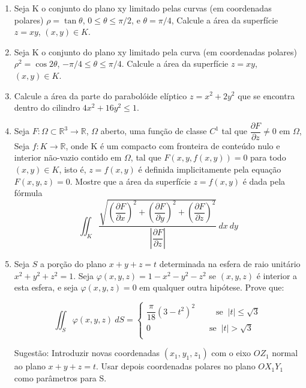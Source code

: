 \documentclass[11pt,a4paper]{article}
\begin{document}
\begin{enumerate}
\item Seja K o conjunto do plano xy limitado pelas curvas (em coordenadas polares) $\rho = \tan \theta$, $0 \leq \theta \leq \pi/2$, e $\theta = \pi/4$, Calcule a área da superfície $z = xy$, $(x,y) \in K$.

\item Seja K o conjunto do plano xy limitado pela curva (em coordenadas polares) $\rho^2 = \cos 2 \theta$, $-\pi/4 \leq \theta \leq \pi/4$. Calcule a área da superfície $z = xy$, $(x,y) \in K$.

\item Calcule a área da parte do parabolóide elíptico $z = x^2 + 2y^2$ que se encontra dentro do cilindro $4x^2 + 16y^2 \leq 1$.

\item Seja $F:\Omega \subset \mathbb{R}^3 \to \mathbb{R}$, $\Omega$  aberto, uma função de classe $C^1$ tal que $\displaystyle\dfrac{\partial F}{\partial z} \neq 0$ em $\Omega$, Seja $f:K \to \mathbb{R}$, onde K é um compacto com fronteira de conteúdo nulo e interior não-vazio contido em $\Omega$, tal que $F(x,y,f(x,y)) = 0$ para todo $(x,y) \in K$, isto é, $z = f(x,y)$ é definida implicitamente pela equação $F(x,y,z) = 0$. Mostre que a área da superfície $z = f(x,y)$ é dada pela fórmula
$$\displaystyle\iint_K \displaystyle\dfrac{\sqrt{\left(\displaystyle\dfrac{\partial F}{\partial x}\right)^2 + \left(\displaystyle\dfrac{\partial F}{\partial y}\right)^2 + \left(\displaystyle\dfrac{\partial F}{\partial z}\right)^2}}{\left| \displaystyle\dfrac{\partial F}{\partial z}\right| } \ dx \ dy$$

\item Seja $S$ a porção do plano $x + y + z = t$ determinada na esfera de raio unitário $x^2 + y^2 + z^2 = 1$. Seja $\varphi (x,y,z) = 1 - x^2 - y^2 - z^2$ se $(x,y,z)$ é interior a esta esfera, e seja $\varphi (x,y,z) = 0$ em qualquer outra hipótese. Prove que:

$$\displaystyle\iint_S \varphi (x,y,z) \ dS  = 
		\begin{cases}
			\displaystyle\dfrac{\pi}{18}(3 - t^2)^2\, \quad\quad \textrm{ se }\  |t| \leq \sqrt{3} \\
			0 \quad\quad\quad\quad\quad\quad\quad  \textrm{se }\ |t| > \sqrt{3} \\
		\end{cases}
$$

Sugestão: Introduzir novas coordenadas $(x_1 \textrm{,}\ y_1 \textrm{,}\ z_1)$ com o eixo $OZ_1$ normal ao plano $x + y + z = t$. Usar depois coordenadas polares no plano $OX_1Y_1$ como parâmetros para S.

\end{enumerate}		
	
\end{document}
